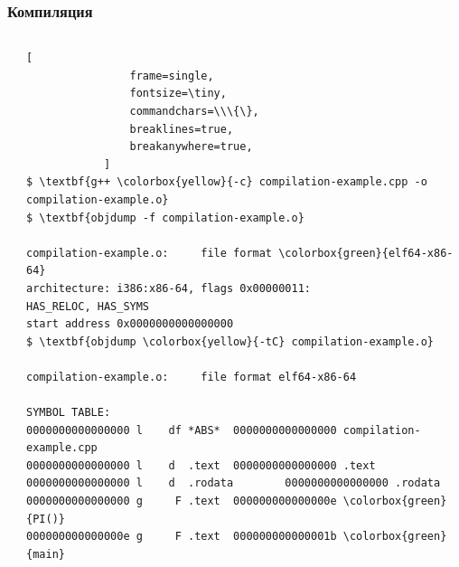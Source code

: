 \documentclass[compress]{beamer}
\begin{document}
\begin{frame}[fragile]

    \frametitle{Компиляция}

    \begin{columns}[T]

        \begin{column}{0.25\textwidth}


        \end{column}

        \begin{column}{0.75\textwidth}

            \begin{Verbatim}[
                frame=single,
                fontsize=\tiny,
                commandchars=\\\{\},
                breaklines=true,
                breakanywhere=true,
            ]
$ \textbf{g++ \colorbox{yellow}{-c} compilation-example.cpp -o compilation-example.o}
$ \textbf{objdump -f compilation-example.o}

compilation-example.o:     file format \colorbox{green}{elf64-x86-64}
architecture: i386:x86-64, flags 0x00000011:
HAS_RELOC, HAS_SYMS
start address 0x0000000000000000
$ \textbf{objdump \colorbox{yellow}{-tC} compilation-example.o}

compilation-example.o:     file format elf64-x86-64

SYMBOL TABLE:
0000000000000000 l    df *ABS*  0000000000000000 compilation-example.cpp
0000000000000000 l    d  .text  0000000000000000 .text
0000000000000000 l    d  .rodata        0000000000000000 .rodata
0000000000000000 g     F .text  000000000000000e \colorbox{green}{PI()}
000000000000000e g     F .text  000000000000001b \colorbox{green}{main}
            \end{Verbatim}

        \end{column}

    \end{columns}

\end{frame}
\end{document}
